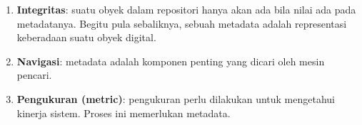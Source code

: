 \documentclass[a4paper]{article}
\begin{document}
\begin{enumerate}
\item \textbf{Integritas}: suatu obyek dalam repositori hanya akan ada bila nilai ada pada metadatanya. Begitu pula sebaliknya, sebuah metadata adalah representasi keberadaan suatu obyek digital.

\item \textbf{Navigasi}: metadata adalah komponen penting yang dicari oleh mesin pencari. 

\item \textbf{Pengukuran (metric)}: pengukuran perlu dilakukan untuk mengetahui kinerja sistem. Proses ini memerlukan metadata. 

\end{enumerate}






\end{document}
